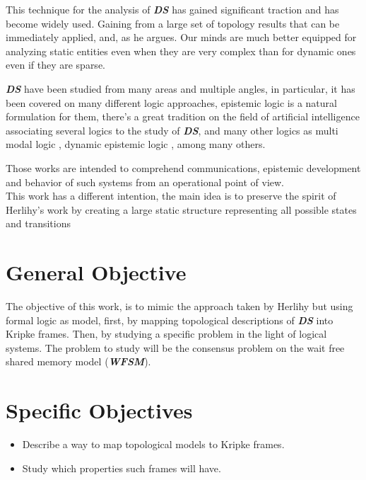 \documentclass[oneside,openany]{tufte-book} %
\newcommand{\ds}{\textbf{\textit{DS}}\xspace}
\newcommand{\sh}{\textbf{\textit{WFSM}}\xspace}
\begin{document}
This technique for the analysis of \ds has gained significant traction 
and has become widely used.
Gaining from a large set of topology results that can be immediately applied, and, as 
he argues. Our minds are much better equipped for analyzing static entities even when they are very complex than for dynamic ones even if they are sparse.

\ds have been studied from many areas and multiple angles, in particular, it has been 
covered on many different logic approaches, epistemic logic \cite{Meyer:1995} is a natural formulation for them, there's a great tradition on the field of artificial intelligence associating several logics to the study of \ds \cite{HandbookAI1}, and many other logics as multi modal logic \cite{Hintikka1962}, dynamic epistemic logic \cite{Ditmarsch:2007}, among many others.

Those works are intended to comprehend communications, epistemic development and behavior of such systems from an operational point of view.\\

This work has a different intention, the main idea is to preserve the spirit of Herlihy's work by creating a large static structure representing all possible states and transitions 



\chapter{General Objective}

The objective of this work, is to mimic the approach taken by Herlihy but using formal logic as model, first, by mapping topological descriptions of {\ds} into Kripke frames. Then, by studying a specific problem in the light of logical systems. The problem to study will be the consensus problem on the wait free shared memory model (\sh).

\chapter{Specific Objectives}


\begin{itemize}[topsep=0pt,itemsep=-1ex,partopsep=1ex,parsep=1ex]
\item Describe a way to map topological models to Kripke frames.
\item Study which properties such frames will have.
\end{itemize}
\end{document}
